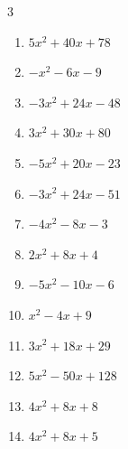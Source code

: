 \begin{multicols}{3}
\begin{enumerate}
  \item $5x^{2}+40x+78$


  \item $-x^{2}-6x-9$


  \item $-3x^{2}+24x-48$


  \item $3x^{2}+30x+80$


  \item $-5x^{2}+20x-23$


  \item $-3x^{2}+24x-51$


  \item $-4x^{2}-8x-3$


  \item $2x^{2}+8x+4$


\columnbreak %

  \item $-5x^{2}-10x-6$


  \item $x^{2}-4x+9$


  \item $3x^{2}+18x+29$


  \item $5x^{2}-50x+128$


  \item $4x^{2}+8x+8$


  \item $4x^{2}+8x+5$


\end{enumerate}
\end{multicols}
